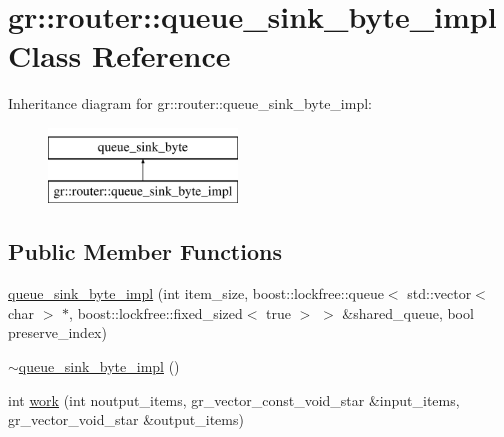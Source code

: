 \hypertarget{classgr_1_1router_1_1queue__sink__byte__impl}{\section{gr\+:\+:router\+:\+:queue\+\_\+sink\+\_\+byte\+\_\+impl Class Reference}
\label{classgr_1_1router_1_1queue__sink__byte__impl}
}
Inheritance diagram for gr\+:\+:router\+:\+:queue\+\_\+sink\+\_\+byte\+\_\+impl\+:\begin{figure}[H]
\begin{center}
\leavevmode
\includegraphics[height=2.000000cm]{classgr_1_1router_1_1queue__sink__byte__impl}
\end{center}
\end{figure}
\subsection*{Public Member Functions}
\begin{DoxyCompactItemize}
\item 
\hyperlink{classgr_1_1router_1_1queue__sink__byte__impl_a0ccee4dde1117105900ac5db604f98a6}{queue\+\_\+sink\+\_\+byte\+\_\+impl} (int item\+\_\+size, boost\+::lockfree\+::queue$<$ std\+::vector$<$ char $>$ $\ast$, boost\+::lockfree\+::fixed\+\_\+sized$<$ true $>$ $>$ \&shared\+\_\+queue, bool preserve\+\_\+index)
\item 
\hyperlink{classgr_1_1router_1_1queue__sink__byte__impl_a77245d6d769eddd788bcc7bc39be18e5}{$\sim$queue\+\_\+sink\+\_\+byte\+\_\+impl} ()
\item 
int \hyperlink{classgr_1_1router_1_1queue__sink__byte__impl_ac740a4bbd4bd2f5dabf1a33e28c9be92}{work} (int noutput\+\_\+items, gr\+\_\+vector\+\_\+const\+\_\+void\+\_\+star \&input\+\_\+items, gr\+\_\+vector\+\_\+void\+\_\+star \&output\+\_\+items)
\end{DoxyCompactItemize}


